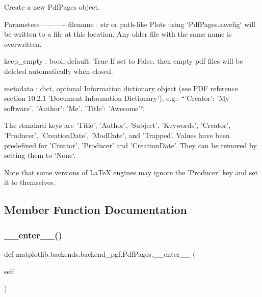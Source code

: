 \begin{DoxyVerb}Create a new PdfPages object.

Parameters
----------
filename : str or path-like
    Plots using `PdfPages.savefig` will be written to a file at this
    location. Any older file with the same name is overwritten.

keep_empty : bool, default: True
    If set to False, then empty pdf files will be deleted automatically
    when closed.

metadata : dict, optional
    Information dictionary object (see PDF reference section 10.2.1
    'Document Information Dictionary'), e.g.:
    ``{'Creator': 'My software', 'Author': 'Me', 'Title': 'Awesome'}``.

    The standard keys are 'Title', 'Author', 'Subject', 'Keywords',
    'Creator', 'Producer', 'CreationDate', 'ModDate', and
    'Trapped'. Values have been predefined for 'Creator', 'Producer'
    and 'CreationDate'. They can be removed by setting them to `None`.

    Note that some versions of LaTeX engines may ignore the 'Producer'
    key and set it to themselves.
\end{DoxyVerb}
 

\subsection{Member Function Documentation}
\mbox{\label{classmatplotlib_1_1backends_1_1backend__pgf_1_1PdfPages_afaa1b617ee1e2ce0d481f497cc8a9bd1}} 
\subsubsection{\texorpdfstring{\+\_\+\+\_\+enter\+\_\+\+\_\+()}{\_\_enter\_\_()}}
{\footnotesize\ttfamily def matplotlib.\+backends.\+backend\+\_\+pgf.\+Pdf\+Pages.\+\_\+\+\_\+enter\+\_\+\+\_\+ (\begin{DoxyParamCaption}\item[{}]{self }\end{DoxyParamCaption})}

